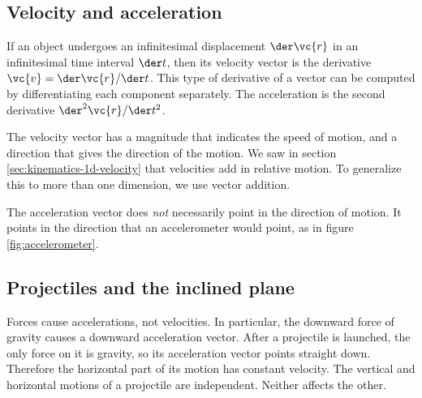 \subsection{Velocity and acceleration}
If an object undergoes an infinitesimal displacement $\der\vc{r}$ in an
infinitesimal time interval $\der t$, then its velocity vector is the derivative
$\vc{v}=\der\vc{r}/\der t$. This type of derivative of a vector can be computed
by differentiating each component separately. The acceleration is the
second derivative $\der^2\vc{r}/\der t^2$.



The velocity vector has a magnitude that indicates the speed of motion, and
a direction that gives the direction of the motion. We saw in section
\ref{sec:kinematics-1d-velocity} that velocities add in relative motion.
To generalize this to more than one dimension, we use vector addition.

The acceleration vector does \emph{not} necessarily point in the direction
of motion. It points in the direction that an accelerometer would point,
as in figure \ref{fig:accelerometer}.


\subsection{Projectiles and the inclined plane}

Forces cause accelerations, not velocities. In particular, the downward force of gravity
causes a downward acceleration vector. After a projectile
is launched, the only force
on it is gravity, so its acceleration vector points straight down. Therefore the horizontal
part of its motion has constant velocity. The vertical and horizontal motions of a projectile
are independent. Neither affects the other.
